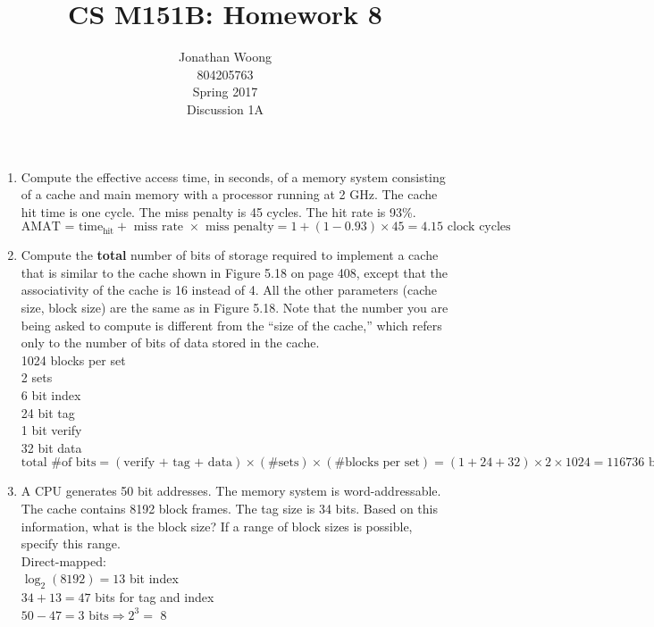 \documentclass[10pt,letterpaper]{article}
\date{\displaydate{date}}
\begin{document}
\title{CS M151B: Homework 8}
\author{
	Jonathan Woong\\
	804205763\\
	Spring 2017\\
	Discussion 1A}
\maketitle
\pagebreak


\begin{enumerate}[label=\textbf{Problem \arabic*.}]
\item Compute the effective access time, in seconds, of a memory system consisting of a cache and main memory with a processor running at 2 GHz. The cache hit time is one cycle. The miss penalty is 45 cycles. The hit rate is 93\%.
\[\boxed{\text{AMAT = time}_{\text{hit}} + \text{ miss rate } \times \text{ miss penalty} = 1 + (1-0.93) \times 45 = 4.15 \text{ clock cycles}}\]
\item Compute the \textbf{total} number of bits of storage required to implement a cache that is similar to the cache shown in Figure 5.18 on page 408, except that the associativity of the cache is 16 instead of 4. All the other parameters (cache size, block size) are the same as in Figure 5.18. Note that the number you are being asked to compute is different from the ``size of the cache,'' which refers only to the number of bits of data stored in the cache.\\
1024 blocks per set\\
2 sets\\
6 bit index\\
24 bit tag\\
1 bit verify\\
32 bit data
\[\text{total \# of bits} = (\text{verify + tag + data}) \times (\text{\# sets}) \times (\text{\# blocks per set}) = (1 + 24 + 32) \times 2 \times 1024 = \boxed{116736 \text{ bits}}\]
\item A CPU generates 50 bit addresses. The memory system is word-addressable. The cache contains 8192 block frames. The tag size is 34 bits. Based on this information, what is the block size? If a range of block sizes is possible, specify this range.\\
Direct-mapped:\\
$\log_2(8192) = 13$ bit index\\
$34 + 13 = 47$ bits for tag and index\\
$50-47 = 3 \text{ bits}\Rightarrow 2^3 =$ 8 

\end{enumerate}
\end{document}
